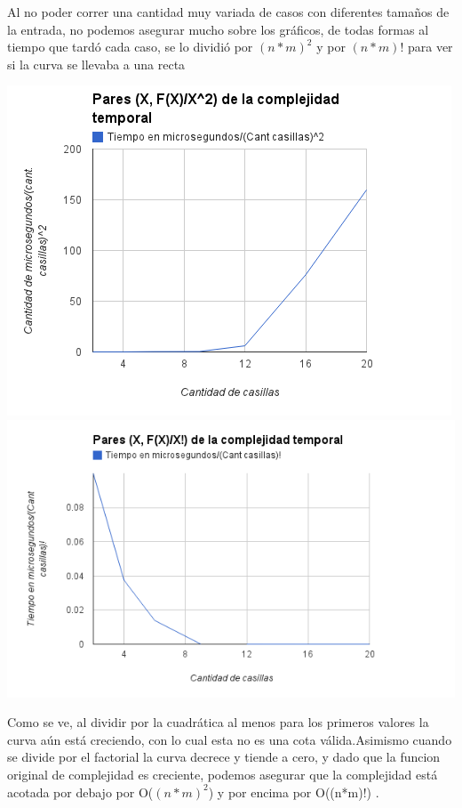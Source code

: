 Al no poder correr una cantidad muy variada de casos con diferentes tama\~nos de la entrada, no podemos asegurar mucho sobre los gr\'aficos, de todas formas al tiempo que tard\'o cada caso, se lo dividi\'o por $(n*m)^2$ y por $(n*m)!$ para ver si la curva se llevaba a una recta
\begin{center}
	\includegraphics[scale=0.70]{images/ej3_cuadratica.png}
	\includegraphics[scale=0.70]{images/ej3_factorial.png}
\end{center}

Como se ve, al dividir por la cuadr\'atica al menos para los primeros valores la curva a\'un est\'a creciendo, con lo cual esta no es una cota v\'alida.Asimismo cuando se divide por el factorial la curva decrece y tiende a cero, y dado que la funcion original de complejidad es creciente, podemos asegurar que la complejidad est\'a acotada por debajo por O($(n*m)^2$) y por encima por O((n*m)!) .

